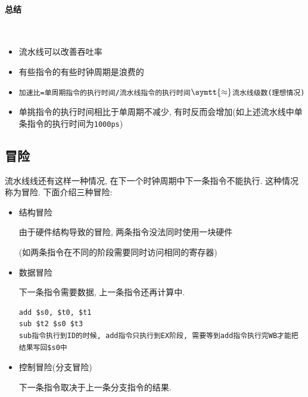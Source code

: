 \paragraph{总结}~{} 
\begin{itemize}
\item 流水线可以改善吞吐率
\item 有些指令的有些时钟周期是浪费的
\item \verb|加速比=单周期指令的执行时间/流水线指令的执行时间|$ \symtt{\approx} $\verb|流水线级数(理想情况)|
\item 单挑指令的执行时间相比于单周期不减少, 有时反而会增加(如上述流水线中单条指令的执行时间为\verb|1000ps|)
\end{itemize}
\subsection{冒险}
流水线线还有这样一种情况, 在下一个时钟周期中下一条指令不能执行. 这种情况称为冒险. 下面介绍三种冒险:
\begin{itemize}
\item 结构冒险 \par 由于硬件结构导致的冒险, 两条指令没法同时使用一块硬件 \par (如两条指令在不同的阶段需要同时访问相同的寄存器)
\item 数据冒险 \par 下一条指令需要数据, 上一条指令还再计算中.
\begin{lstlisting}
add $s0, $t0, $t1
sub $t2 $s0 $t3
sub指令执行到ID的时候, add指令只执行到EX阶段, 需要等到add指令执行完WB才能把结果写回$s0中
\end{lstlisting}
\item 控制冒险(分支冒险) \par 下一条指令取决于上一条分支指令的结果.
\end{itemize}

